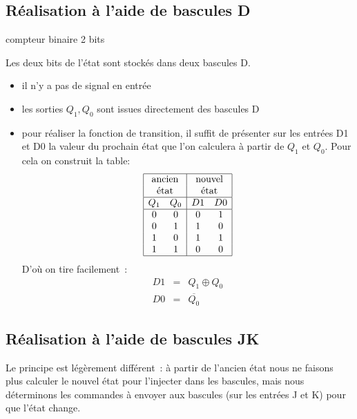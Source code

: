 \subsection{R\'ealisation \`a l'aide de bascules D}

\begin{exemple}{compteur binaire 2 bits}

Les deux bits de l'\'etat sont stock\'es dans deux bascules D.
\begin{itemize}
\item il n'y a pas de signal en entr\'ee
\item les sorties $Q_1, Q_0$ sont issues directement des bascules D
\item pour r\'ealiser la fonction de transition, il suffit de pr\'esenter sur
les entr\'ees D1 et D0 la valeur du prochain \'etat que l'on calculera
\`a partir de $ Q_1$ et $Q_0$. Pour cela on construit la table:
$$ \begin{array}{|cc|cc|}
\hline 
\multicolumn{2}{|c|}{	\mbox{ancien} } &
\multicolumn{2}{c|}{	\mbox{nouvel}} \\
\multicolumn{2}{|c|}{	\mbox{\'etat} } &
\multicolumn{2}{c|}{	\mbox{\'etat}} \\
\hline
	Q_1 & Q_0 &	D1 & D0 \\
\hline
	0 &  0 &	0 &  1 \\
	0 &  1 &	1 &  0 \\
	1 &  0 &    	1 &  1 \\
	1 &  1 &	0 &  0 \\
\hline
\end{array} $$
D'o\`u on tire facilement~:
$$ \begin{array}{rcl}
	D1 &=& Q_1 \oplus  Q_0 \\
	D0 &=& \overline{ Q_0}
\end{array}
$$
\end{itemize}
\end{exemple}

\subsection{R\'ealisation \`a l'aide de bascules JK}

Le principe est l\'eg\`erement diff\'erent~: \`a partir de l'ancien \'etat 
nous ne faisons plus calculer le nouvel \'etat pour l'injecter dans 
les bascules, mais nous d\'eterminons les commandes \`a envoyer aux bascules
(sur les entr\'ees J et K) pour que l'\'etat change.

